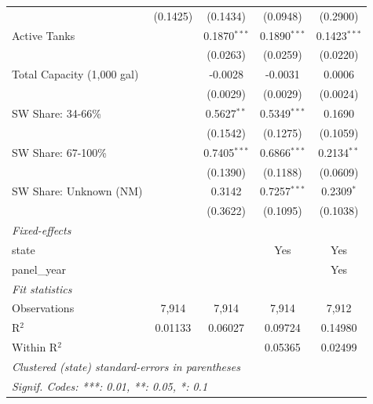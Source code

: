 \begin{tabular}{lcccc}
                              & (0.1425)        & (0.1434)        & (0.0948)        & (0.2900)\\   
   Active Tanks               &                 & 0.1870$^{***}$  & 0.1890$^{***}$  & 0.1423$^{***}$\\   
                              &                 & (0.0263)        & (0.0259)        & (0.0220)\\   
   Total Capacity (1,000 gal) &                 & -0.0028         & -0.0031         & 0.0006\\   
                              &                 & (0.0029)        & (0.0029)        & (0.0024)\\   
   SW Share: 34-66\%          &                 & 0.5627$^{**}$   & 0.5349$^{***}$  & 0.1690\\   
                              &                 & (0.1542)        & (0.1275)        & (0.1059)\\   
   SW Share: 67-100\%         &                 & 0.7405$^{***}$  & 0.6866$^{***}$  & 0.2134$^{**}$\\   
                              &                 & (0.1390)        & (0.1188)        & (0.0609)\\   
   SW Share: Unknown (NM)     &                 & 0.3142          & 0.7257$^{***}$  & 0.2309$^{*}$\\   
                              &                 & (0.3622)        & (0.1095)        & (0.1038)\\   
   \midrule
   \emph{Fixed-effects}\\
   state                      &                 &                 & Yes             & Yes\\  
   panel\_year                &                 &                 &                 & Yes\\  
   \midrule
   \emph{Fit statistics}\\
   Observations               & 7,914           & 7,914           & 7,914           & 7,912\\  
   R$^2$                      & 0.01133         & 0.06027         & 0.09724         & 0.14980\\  
   Within R$^2$               &                 &                 & 0.05365         & 0.02499\\  
   \midrule \midrule
   \multicolumn{5}{l}{\emph{Clustered (state) standard-errors in parentheses}}\\
   \multicolumn{5}{l}{\emph{Signif. Codes: ***: 0.01, **: 0.05, *: 0.1}}\\
\end{tabular}
\par\endgroup


